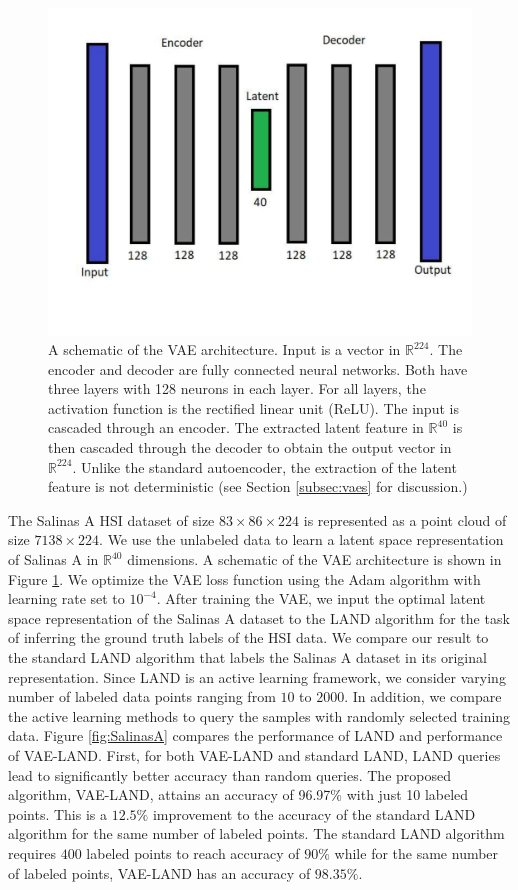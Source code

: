 \documentclass{article}
\def\R{\mathbb{R}}
\def\R{{\mathbb R}}
\begin{document}
\begin{figure}[h]
\centering
\includegraphics[clip,width=.45\textwidth,trim=1cm 3.5cm 1cm 1cm]{Images/VAE_Schematics.pdf}
\caption{\small{A schematic of the VAE architecture.  Input is a vector in $\R^{224}$. The encoder and decoder are fully connected neural networks. Both have three layers with 128 neurons in each layer. For all layers, the activation function is the rectified linear unit (ReLU).
The input is cascaded through an encoder. The extracted latent feature in $\R^{40}$ is then cascaded through the decoder to obtain the
output vector in $\R^{224}$.  Unlike the standard autoencoder, the extraction of the latent feature is not deterministic (see Section \ref{subsec:vaes} for discussion.)}}
\label{fig:vae_schematics}
\end{figure}
The Salinas A HSI dataset of size $83 \times 86\times 224$ is represented as a point cloud of size $7138\times 224$. We use the unlabeled data to learn a latent space representation of Salinas A in $\R^{40}$ dimensions. A schematic of the VAE architecture is shown in Figure \ref{fig:vae_schematics}. We optimize the VAE loss function using the Adam algorithm with learning rate set to $10^{-4}$. After training the VAE, we input the optimal latent space representation of the Salinas A dataset to the LAND algorithm for the task of inferring the ground truth labels of the HSI data. We compare our result to the standard LAND algorithm that labels the Salinas A dataset in its original representation. Since LAND is an active learning framework, we consider varying number of labeled data points ranging from $10$ to $2000$. In addition, we compare the active learning methods to query the samples with randomly selected training data. Figure \ref{fig:SalinasA} compares the performance of LAND and performance of VAE-LAND. First, for both VAE-LAND and standard LAND, LAND queries lead to significantly better accuracy than random queries. The proposed algorithm, VAE-LAND, attains an accuracy of 96.97\% with just 10 labeled points. This is a $12.5\%$ improvement to the accuracy of the standard LAND algorithm for the same number of labeled points. The standard LAND algorithm requires $400$ labeled points to reach accuracy of $90\%$ while for the same number of labeled points, VAE-LAND has an accuracy of $98.35\%$. 
\end{document}
